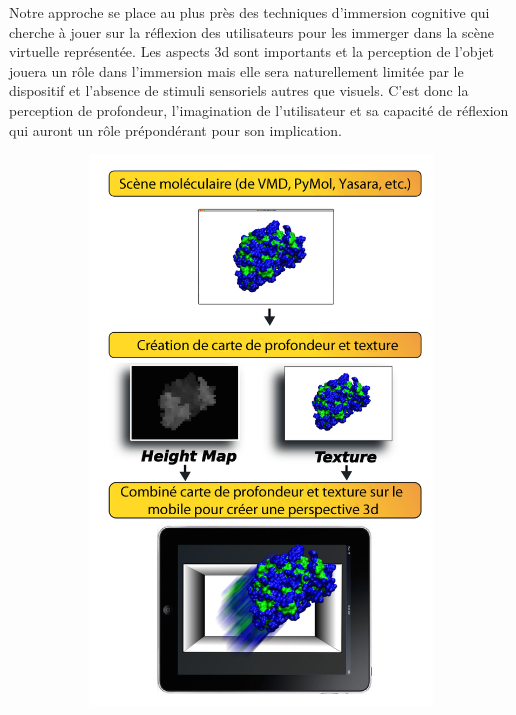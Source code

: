 Notre approche se place au plus près des techniques d'immersion cognitive qui cherche à jouer sur la réflexion des utilisateurs pour les immerger dans la scène virtuelle représentée. Les aspects 3d sont importants et la perception de l'objet jouera un rôle dans l'immersion mais elle sera naturellement limitée par le dispositif et l'absence de stimuli sensoriels autres que visuels. C'est donc la perception de profondeur, l'imagination de l'utilisateur et sa capacité de réflexion qui auront un rôle prépondérant pour son implication.

\begin{figure}[h]
\begin{subfigure}{.5\textwidth}
  \centering
  {\includegraphics[width=.75\linewidth]{./figures/ch3/depthmol3d_process_edit}}
    \caption{}
  \label{Fig:depthmol3d_process}
\end{subfigure}
\begin{subfigure}{.5\textwidth}
  \centering

\end{subfigure}
\end{figure}
